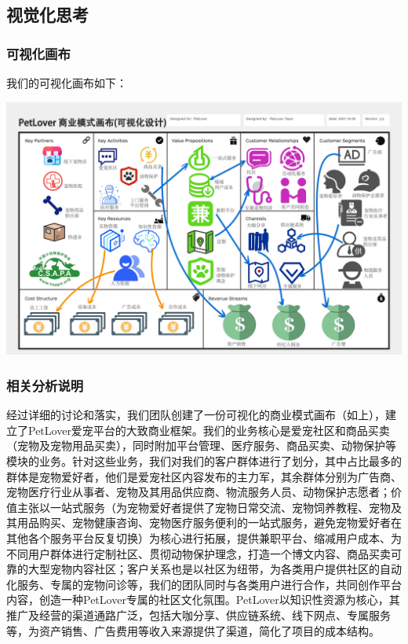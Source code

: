 \documentclass[a4paper]{ctexart}
\begin{document}
\subsection{视觉化思考}

\subsubsection{可视化画布}

我们的可视化画布如下：

\begin{center}
  \includegraphics[width=16cm]{./可视化画布/可视化商业画布v2（带联系版）}
\end{center}

\subsubsection{相关分析说明}

经过详细的讨论和落实，我们团队创建了一份可视化的商业模式画布（如上），建立了PetLover爱宠平台的大致商业框架。我们的业务核心是爱宠社区和商品买卖（宠物及宠物用品买卖），同时附加平台管理、医疗服务、商品买卖、动物保护等模块的业务。针对这些业务，我们对我们的客户群体进行了划分，其中占比最多的群体是宠物爱好者，他们是爱宠社区内容发布的主力军，其余群体分别为广告商、宠物医疗行业从事者、宠物及其用品供应商、物流服务人员、动物保护志愿者；价值主张以一站式服务（为宠物爱好者提供了宠物日常交流、宠物饲养教程、宠物及其用品购买、宠物健康咨询、宠物医疗服务便利的一站式服务，避免宠物爱好者在其他各个服务平台反复切换）为核心进行拓展，提供兼职平台、缩减用户成本、为不同用户群体进行定制社区、贯彻动物保护理念，打造一个博文内容、商品买卖可靠的大型宠物内容社区；客户关系也是以社区为纽带，为各类用户提供社区的自动化服务、专属的宠物问诊等，我们的团队同时与各类用户进行合作，共同创作平台内容，创造一种PetLover专属的社区文化氛围。PetLover以知识性资源为核心，其推广及经营的渠道通路广泛，包括大咖分享、供应链系统、线下网点、专属服务等，为资产销售、广告费用等收入来源提供了渠道，简化了项目的成本结构。
\end{document}

